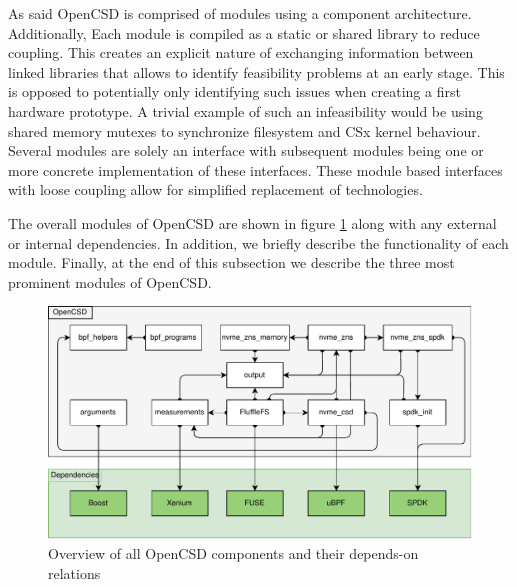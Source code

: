 
As said OpenCSD is comprised of modules using a component architecture.
Additionally, Each module is compiled as a static or shared library to reduce
coupling. This creates an explicit nature of exchanging information between
linked libraries that allows to identify feasibility problems at an early stage.
This is opposed to potentially only identifying such issues when creating a
first hardware prototype. A trivial example of such an infeasibility would be
using shared memory mutexes to synchronize filesystem and CSx kernel behaviour.
Several modules are solely an interface with subsequent modules being one or
more concrete implementation of these interfaces. These module based interfaces
with loose coupling allow for simplified replacement of technologies.


The overall modules of OpenCSD are shown in figure
\ref{figure:moduledependencies} along with any external or internal
dependencies. In addition, we briefly describe the functionality of each module.
Finally, at the end of this subsection we describe the three most prominent
modules of OpenCSD.


\begin{figure}
    \centering
	\includegraphics[width=1\textwidth]{resources/images/module-dependencies.pdf}
	\caption{Overview of all OpenCSD components and their depends-on relations}
    \label{figure:moduledependencies}
\end{figure}

